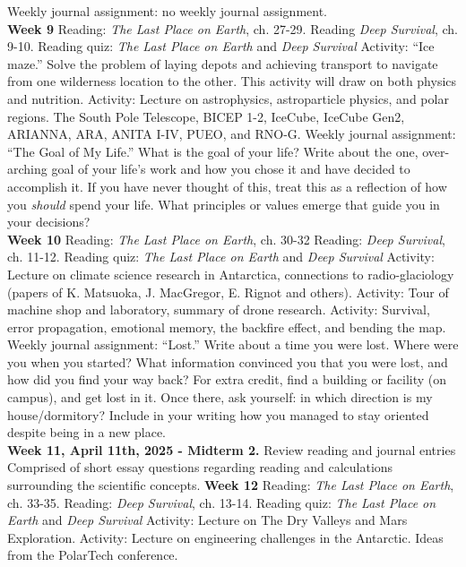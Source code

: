 \documentclass[10pt]{article}
\begin{document}
\begin{outline}[enumerate]
\2 Weekly journal assignment: no weekly journal assignment. \\
\1 \textbf{Week 9}
\2 Reading: \textit{The Last Place on Earth}, ch. 27-29.
\2 Reading \textit{Deep Survival}, ch. 9-10.
\2 Reading quiz: \textit{The Last Place on Earth} and \textit{Deep Survival}
\2 Activity: ``Ice maze.''  Solve the problem of laying depots and achieving transport to navigate from one wilderness location to the other.  This activity will draw on both physics and nutrition.
\2 Activity: Lecture on astrophysics, astroparticle physics, and polar regions.  The South Pole Telescope, BICEP 1-2, IceCube, IceCube Gen2, ARIANNA, ARA, ANITA I-IV, PUEO, and RNO-G.
\2 Weekly journal assignment: ``The Goal of My Life.'' What is the goal of your life?  Write about the one, over-arching goal of your life's work and how you chose it and have decided to accomplish it.  If you have never thought of this, treat this as a reflection of how you \textit{should} spend your life.  What principles or values emerge that guide you in your decisions? \\
\1 \textbf{Week 10}
\2 Reading: \textit{The Last Place on Earth}, ch. 30-32
\2 Reading: \textit{Deep Survival}, ch. 11-12.
\2 Reading quiz: \textit{The Last Place on Earth} and \textit{Deep Survival}
\2 Activity: Lecture on climate science research in Antarctica, connections to radio-glaciology (papers of K. Matsuoka, J. MacGregor, E. Rignot and others).
\2 Activity: Tour of machine shop and laboratory, summary of drone research.
\2 Activity: Survival, error propagation, emotional memory, the backfire effect, and bending the map.
\2 Weekly journal assignment: ``Lost.'' Write about a time you were lost.  Where were you when you started?  What information convinced you that you were lost, and how did you find your way back?  For extra credit, find a building or facility (on campus), and get lost in it.  Once there, ask yourself: in which direction is my house/dormitory?  Include in your writing how you managed to stay oriented despite being in a new place. \\
\1 \textbf{Week 11, April 11th, 2025 - Midterm 2.}
\2 Review reading and journal entries
\2 Comprised of short essay questions regarding reading and calculations surrounding the scientific concepts.
\1 \textbf{Week 12}
\2 Reading: \textit{The Last Place on Earth}, ch. 33-35.
\2 Reading: \textit{Deep Survival}, ch. 13-14.
\2 Reading quiz: \textit{The Last Place on Earth} and \textit{Deep Survival}
\2 Activity: Lecture on The Dry Valleys and Mars Exploration.
\2 Activity: Lecture on engineering challenges in the Antarctic.  Ideas from the PolarTech conference.

\end{outline}
\end{document}
